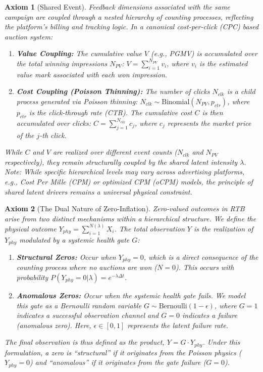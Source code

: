 \documentclass[sigconf, anonymous, review]{acmart}
\newtheorem{axiom}{Axiom}
\begin{document}
\begin{axiom}[Shared Event]
\label{ax:shared}
Feedback dimensions associated with the same campaign are coupled through a nested hierarchy of counting processes, reflecting the platform's billing and tracking logic. In a canonical cost-per-click (CPC) based auction system:
\begin{enumerate}
    \item \textbf{Value Coupling:} The cumulative value $V$ (e.g., PGMV) is accumulated over the total winning impressions $N_{PV}$: $V = \sum_{i=1}^{N_{PV}} v_i$, where $v_i$ is the estimated value mark associated with each won impression.
    \item \textbf{Cost Coupling (Poisson Thinning):} The number of clicks $N_{clk}$ is a child process generated via Poisson thinning: $N_{clk} \sim \text{Binomial}(N_{PV}, p_{ctr})$, where $p_{ctr}$ is the click-through rate (CTR). The cumulative cost $C$ is then accumulated over clicks: $C = \sum_{j=1}^{N_{clk}} c_j$, where $c_j$ represents the market price of the $j$-th click.
\end{enumerate}
While $C$ and $V$ are realized over different event counts ($N_{clk}$ and $N_{PV}$ respectively), they remain structurally coupled by the shared latent intensity $\lambda$. 
\textit{Note: While specific hierarchical levels may vary across advertising platforms, e.g., Cost Per Mille (CPM) or optimized CPM (oCPM) models, the principle of shared latent drivers remains a universal physical constraint.}
\end{axiom}



\begin{axiom}[The Dual Nature of Zero-Inflation]
\label{ax:zi_dual}
Zero-valued outcomes in RTB arise from two distinct mechanisms within a hierarchical structure. We define the physical outcome $Y_{phy} = \sum_{i=1}^{N(\lambda)} X_i$.
The total observation $Y$ is the realization of $Y_{phy}$ modulated by a systemic health gate $G$:
\begin{enumerate}
    \item \textbf{Structural Zeros:} Occur when $Y_{phy} = 0$, which is a direct consequence of the counting process where no auctions are won ($N=0$). This occurs with probability $P(Y_{phy}=0|\lambda) = e^{-\lambda\Delta t}$.
    \item \textbf{Anomalous Zeros:} Occur when the systemic health gate fails. We model this gate as a Bernoulli random variable $G \sim \text{Bernoulli}(1-\epsilon)$, where $G=1$ indicates a successful observation channel and $G=0$ indicates a failure (anomalous zero). Here, $\epsilon \in [0, 1]$ represents the latent failure rate.
\end{enumerate}
The final observation is thus defined as the product, $Y = G \cdot Y_{phy}$.
Under this formulation, a zero is ``structural'' if it originates from the Poisson physics ($Y_{phy}=0$) and ``anomalous'' if it originates from the gate failure ($G=0$).
\end{axiom}
\end{document}
